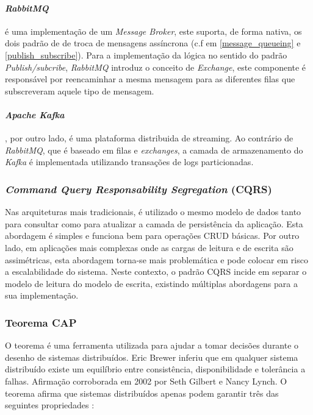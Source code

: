 \paragraph{\emph{RabbitMQ}} é uma implementação de um \emph{Message Broker}, este suporta, de forma nativa, os dois padrão de de troca de mensagens assíncrona (c.f em \ref{message_queueing} e \ref{publish_subscribe}). Para a implementação da lógica no sentido do padrão \emph{Publish/subcribe}, \emph{RabbitMQ} introduz o conceito de \emph{Exchange}, este componente é responsável por reencaminhar a mesma mensagem para as diferentes filas que subscreveram aquele tipo de mensagem.

\paragraph{\emph{Apache Kafka}}, por outro lado, é uma plataforma distribuida de streaming. Ao contrário de \emph{RabbitMQ}, que é baseado em filas e \emph{exchanges}, a camada de armazenamento do \emph{Kafka} é implementada utilizando transações de logs particionadas.

\subsubsection{\emph{Command Query Responsability Segregation} (CQRS)} \label{cqrs}
Nas arquiteturas mais tradicionais, é utilizado o mesmo modelo de dados tanto para consultar como para atualizar a camada de persistência da aplicação. Esta abordagem é simples e funciona bem para operações CRUD básicas. Por outro lado, em aplicações mais complexas onde as cargas de leitura e de escrita são assimétricas, esta abordagem torna-se mais problemática e pode colocar em risco a escalabilidade do sistema. Neste contexto, o padrão CQRS incide em separar o modelo de leitura do modelo de escrita, existindo múltiplas abordagens para a sua implementação. \cite{cqrs}

\subsubsection{Teorema CAP} \label{cap_theorem}

O teorema é uma ferramenta utilizada para ajudar a tomar decisões durante o desenho de sistemas distribuídos. Eric Brewer inferiu que em qualquer sistema distribuído existe um equilíbrio entre consistência, disponibilidade e tolerância a falhas. Afirmação corroborada em 2002 por Seth Gilbert e Nancy Lynch. O teorema afirma que sistemas distribuídos apenas podem garantir três das seguintes propriedades \cite{cap_theorem}:

